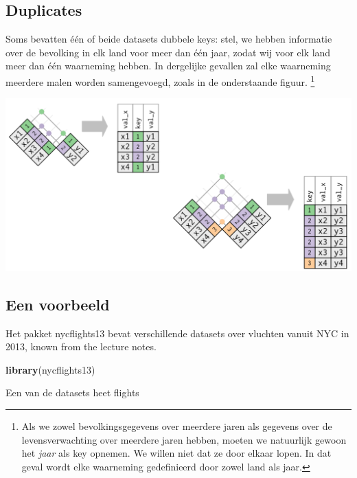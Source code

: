 \documentclass[]{tufte-book}
\newenvironment{Shaded}{}{}
\newcommand{\KeywordTok}[1]{\textcolor[rgb]{0.00,0.44,0.13}{\textbf{#1}}}
\newcommand{\NormalTok}[1]{#1}
\newcommand{\OperatorTok}[1]{\textcolor[rgb]{0.40,0.40,0.40}{#1}}
\newcommand{\StringTok}[1]{\textcolor[rgb]{0.25,0.44,0.63}{#1}}
\begin{document}
\hypertarget{duplicates}{%
\subsection{Duplicates}\label{duplicates}}

Soms bevatten één of beide datasets dubbele keys: stel, we hebben informatie over de bevolking in elk land voor meer dan één jaar, zodat wij voor elk land meer dan één waarneming hebben. In dergelijke gevallen zal elke waarneming meerdere malen worden samengevoegd, zoals in de onderstaande figuur. \footnote{Als we zowel bevolkingsgegevens over meerdere jaren als gegevens over de levensverwachting over meerdere jaren hebben, moeten we natuurlijk gewoon het \emph{jaar} als key opnemen. We willen niet dat ze door elkaar lopen. In dat geval wordt elke waarneming gedefinieerd door zowel land als jaar.}

\includegraphics[width=1\linewidth]{images/join_duplicates}

\hypertarget{een-voorbeeld}{%
\subsection{Een voorbeeld}\label{een-voorbeeld}}

Het pakket nycflights13 bevat verschillende datasets over vluchten vanuit NYC in 2013, known from the lecture notes.

\begin{Shaded}
\begin{Highlighting}[]
\KeywordTok{library}\NormalTok{(nycflights13)}
\end{Highlighting}
\end{Shaded}

Een van de datasets heet flights

\begin{Shaded}
\end{Shaded}
\end{document}
